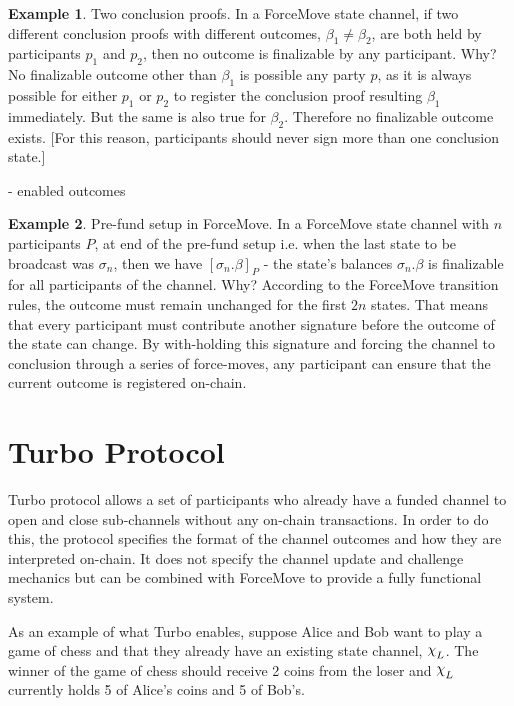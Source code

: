 \documentclass{article}
\DeclareRobustCommand{\rchi}{{\mathpalette\irchi\relax}}
\newcommand{\irchi}[2]{\raisebox{\depth}{$#1\chi$}} %
\theoremstyle{definition}
\newtheorem{example}{Example}[section]
\newcommand{\enf}[1]{[#1]}
\begin{document}
\begin{example}{Two conclusion proofs.}
  In a ForceMove state channel, if two different conclusion proofs with different outcomes,
  $\beta_1 \neq \beta_2$, are both held by participants $p_1$ and $p_2$, then no outcome is finalizable by any participant.
  Why? No finalizable outcome other than $\beta_1$ is possible any party $p$, as it is always
  possible for either $p_1$ or $p_2$ to register the conclusion proof resulting $\beta_1$ immediately.
  But the same is also true for $\beta_2$. Therefore no finalizable outcome exists.
  [For this reason, participants should never sign more than one conclusion state.]
\end{example}

- enabled outcomes




\begin{example}{Pre-fund setup in ForceMove.}
  In a ForceMove state channel with $n$ participants $P$, at end of the pre-fund setup i.e.
  when the last state to be broadcast was $\sigma_n$, then we have $\enf{\sigma_n.\beta}_P$ -
  the state's balances $\sigma_n.\beta$ is finalizable for all participants of the channel.
  Why? According to the ForceMove transition rules, the outcome must remain unchanged for the
  first $2n$ states. That means that every participant must contribute another signature before
  the outcome of the state can change. By with-holding this signature and forcing the channel to
  conclusion through a series of force-moves, any participant can ensure that the current
  outcome is registered on-chain.
\end{example}

\section{Turbo Protocol}

Turbo protocol allows a set of participants who already have a funded channel to open and
close sub-channels without any on-chain transactions. 
In order to do this, the protocol specifies the format of the channel outcomes and how
they are interpreted on-chain.
It does not specify the channel update and challenge mechanics but can be combined with
ForceMove to provide a fully functional system.

As an example of what Turbo enables, suppose Alice and Bob want to play a game of chess and that
they already have an existing state channel, $\rchi_L$.
The winner of the game of chess should receive 2 coins from the loser and $\rchi_L$ currently holds
5 of Alice's coins and 5 of Bob's.
\end{document}
